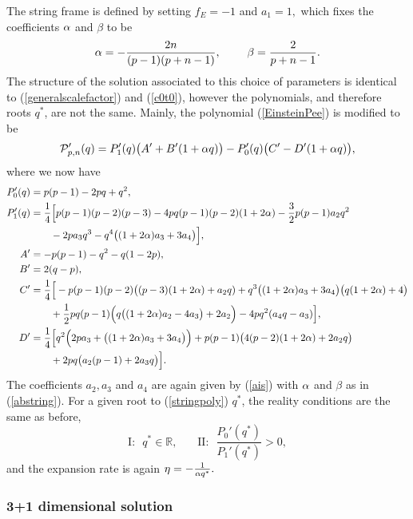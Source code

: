 \documentclass[amsmath,amssymb,11pt]{article}
\begin{document}
The string frame is defined by setting $f_E=-1$ and $a_1 = 1,$ which fixes the coefficients $\alpha$ and $\beta$ to be
\begin{equation}\label{abstring}
\alpha=-\frac{2n}{(p-1)(p+n-1)}, \ \ \ \ \ \ \ \beta = \frac{2}{p+n-1}.
\end{equation}
The structure of the solution associated to this choice of parameters is identical to  (\ref{generalscalefactor}) and (\ref{c0t0}), however the polynomials, and therefore roots $q^*$, are not the same. Mainly, the polynomial (\ref{EinsteinPee}) is modified to be
\begin{equation}\label{stringpoly}
\mathcal{P}'_{p,n}(q)=P'_1(q)\big(A'+B'(1+\alpha q)\big)-P_0'(q)\big( C'-D'(1+\alpha q)\big),
\end{equation}
where we now have
\begin{equation}
\begin{split}
P_0'(q)&=p(p-1)-2pq+q^2, \\
P_1'(q)&=\frac{1}{4}\Big[p(p-1)(p-2)(p-3)-4pq(p-1)(p-2)(1+2\alpha)-\frac{3}{2}p(p-1)a_2 q^2 \\
& \ \ \ \ \ \ -2pa_3q^3-q^4\big((1+2\alpha)a_3+3a_4\big)\Big], \\
A'&=-p(p-1)-q^2-q(1-2p), \\
B'&=2(q-p), \\
C'&=\frac{1}{4}\Big[-p(p-1)(p-2)\big((p-3)(1+2\alpha)+a_2 q)+q^3\big((1+2\alpha)a_3+3a_4\big)\big(q(1+2\alpha)+4\big) \\
& \ \ \ \ \ \ +\frac{1}{2}pq(p-1)\Big(q\big( (1+2\alpha)a_2-4a_3\big)+2a_2\Big)-4pq^2(a_4 q-a_3)\Big], \\
D'&= \frac{1}{4}\Big[q^2\Big(2pa_3+\big( (1+2\alpha)a_3+3a_4\big) \Big)+p(p-1)\big(4(p-2)(1+2\alpha)+2a_2  q\big) \\
& \ \ \ \ \ \ +2pq\big(a_2(p-1)+2a_3 q\big)\Big].
\end{split}
\end{equation}
The coefficients $a_2, a_3$ and $a_4$ are again given by (\ref{ais}) with $\alpha$ and $\beta$ as in (\ref{abstring}). For a given root to (\ref{stringpoly}) $q^*$, the reality conditions are the same as before,
\begin{equation}
\text{I:} \ \ \ q^*\in\mathbb{R}, \ \ \ \ \ \ \ \ \text{II:} \ \ \ \frac{P_0'(q^*)}{P_1'(q^*)}>0,
\end{equation}
and the expansion rate is again $\eta = -\frac{1}{\alpha q^*}.$ 

\subsubsection*{3+1 dimensional solution}
\end{document}
